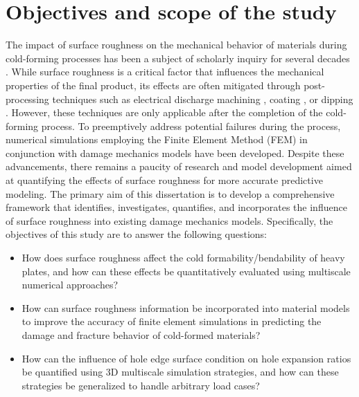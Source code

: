 \section{Objectives and scope of the study}\label{ch:intro:se:obj}

The impact of surface roughness on the mechanical behavior of materials during cold-forming processes has been a subject of scholarly inquiry for several decades \autocite{ahnRelationshipShearStrength2021,bazriMechanicalTribometallurgicalBehavior2022,csertaEffectsGraniteformingMinerals2021,grochePredictionEvolutionSurface2015,heruthunnisaInvestigationsFormabilityTensile2022}. While surface roughness is a critical factor that influences the mechanical properties of the final product, its effects are often mitigated through post-processing techniques such as electrical discharge machining \autocite{amorimSurfaceModificationTool2017}, coating \autocite{creusCorrosionBehaviourTiN1998}, or dipping \autocite{karduckCharacterisationIntermediateLayers1997}. However, these techniques are only applicable after the completion of the cold-forming process. To preemptively address potential failures during the process, numerical simulations employing the Finite Element Method (FEM) in conjunction with damage mechanics models have been developed. Despite these advancements, there remains a paucity of research and model development aimed at quantifying the effects of surface roughness for more accurate predictive modeling.
The primary aim of this dissertation is to develop a comprehensive framework that identifies, investigates, quantifies, and incorporates the influence of surface roughness into existing damage mechanics models. Specifically, the objectives of this study are to answer the following questions:
\begin{itemize}
    \item How does surface roughness affect the cold formability/bendability of heavy plates, and how can these effects be quantitatively evaluated using multiscale numerical approaches?
    \item How can surface roughness information be incorporated into material models to improve the accuracy of finite element simulations in predicting the damage and fracture behavior of cold-formed materials?
    \item How can the influence of hole edge surface condition on hole expansion ratios be quantified using 3D multiscale simulation strategies, and how can these strategies be generalized to handle arbitrary load cases?
\end{itemize}
